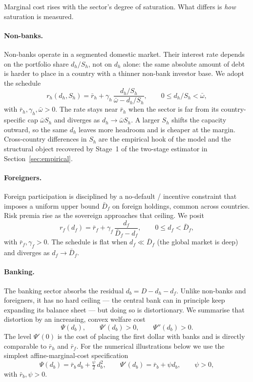 \documentclass[\latexroot/\projectname]{subfiles}
\begin{document}
Marginal cost rises with the sector's degree of saturation. What
differs is \emph{how} saturation is measured.

\paragraph{Non-banks.}
Non-banks operate in a segmented domestic market. Their interest rate
depends on the portfolio share $d_h/S_h$, not on $d_h$ alone: the same
absolute amount of debt is harder to place in a country with a thinner
non-bank investor base. We adopt the schedule
\begin{equation}\label{eq:nonbank-rate}
  r_h(d_h,S_h) = \bar r_h + \gamma_h\,
    \frac{d_h/S_h}{\bar\omega - d_h/S_h},
  \qquad 0\le d_h/S_h<\bar\omega,
\end{equation}
with $\bar r_h,\gamma_h,\bar\omega>0$. The rate stays near $\bar r_h$
when the sector is far from its country-specific cap $\bar\omega S_h$
and diverges as $d_h\to\bar\omega S_h$. A larger $S_h$ shifts the
capacity outward, so the same $d_h$ leaves more headroom and is
cheaper at the margin. Cross-country differences in $S_h$ are the
empirical hook of the model and the structural object recovered by
Stage~1 of the two-stage estimator in
Section~\ref{sec:empirical}.

\paragraph{Foreigners.}
Foreign participation is disciplined by a no-default / incentive
constraint that imposes a uniform upper bound $\bar D_f$ on foreign
holdings, common across countries. Risk premia rise as the sovereign
approaches that ceiling. We posit
\begin{equation}\label{eq:foreign-rate}
  r_f(d_f) = \bar r_f + \gamma_f\,
    \frac{d_f}{\bar D_f - d_f},
  \qquad 0\le d_f<\bar D_f,
\end{equation}
with $\bar r_f,\gamma_f>0$. The schedule is flat when
$d_f\ll\bar D_f$ (the global market is deep) and diverges as
$d_f\to\bar D_f$.

\paragraph{Banking.}
The banking sector absorbs the residual $d_b=D-d_h-d_f$. Unlike
non-banks and foreigners, it has no hard ceiling --- the central bank
can in principle keep expanding its balance sheet --- but doing so is
distortionary. We summarise that distortion by an increasing, convex
welfare cost
\begin{equation}\label{eq:banking-cost}
  \Psi(d_b),\qquad \Psi'(d_b)>0,\qquad \Psi''(d_b)>0.
\end{equation}
The level $\Psi'(0)$ is the cost of placing the first dollar with
banks and is directly comparable to $\bar r_h$ and $\bar r_f$. For
the numerical illustrations below we use the simplest
affine-marginal-cost specification
\begin{equation}\label{eq:psi-affine}
  \Psi(d_b) = \bar r_b\,d_b + \tfrac{\psi}{2}\,d_b^{2},
  \qquad \Psi'(d_b)=\bar r_b+\psi d_b,\qquad \psi>0,
\end{equation}
with $\bar r_b,\psi>0$.
\end{document}
